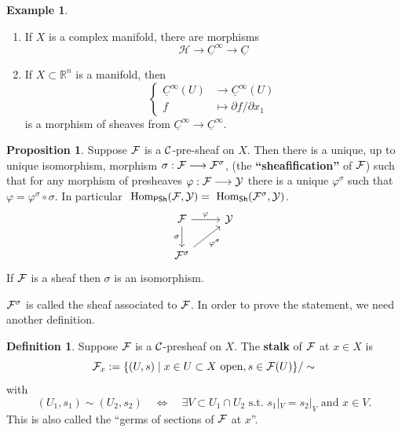 \documentclass[11pt]{article}
\theoremstyle{definition}
\newtheorem{prop}[thm]{Proposition}
\newtheorem{dfn}[thm]{Definition}
\newtheorem{ex}[thm]{Example}
\renewcommand{\hom}{\text{ Hom}}
\newcommand{\reals}{\mathbb R}
\newcommand{\calf}{{\cal F}}
\newcommand{\calc}{{\cal C}}
\begin{document}
\begin{ex}\ 
    \begin{enumerate}[label=(\arabic*)]
        \item 
        If $X$ is a complex manifold, there are morphisms
        $$
        \mathcal H \longrightarrow \underline C^\infty \longrightarrow \underline C
        $$
        \item
        If $X\subset \reals^n$ is a manifold, then
        $$
        \left\{
        \begin{aligned}
        \underline C^\infty (U) & \longrightarrow \underline C^\infty(U) \\
        f & \longmapsto \partial f / \partial x_1
        \end{aligned}
        \right.
        $$
        is a morphism of sheaves from $\underline C^\infty \longrightarrow \underline C^\infty$.
    \end{enumerate}
\end{ex}

\begin{prop}
    Suppose $\calf$ is a $\calc$-pre-sheaf on $X$. Then there is a unique, up to unique isomorphism, morphism $\sigma: \calf\longrightarrow \calf^\sigma$, (the \textbf{``sheafification''} of $\calf$) such that for any morphism of presheaves $\varphi: \calf \longrightarrow \mathcal Y$ there is a unique $\varphi^\sigma$ such that $\varphi = \varphi^\sigma \circ \sigma$. In particular $\hom_{\mathsf{PSh}} (\calf, \mathcal Y) = \hom_{\mathsf{Sh}} (\calf^\sigma, \mathcal Y)$.
    $$
    \begin{tikzcd}
    \calf \arrow[r, "\varphi"] \arrow[d, "\sigma"'] & \mathcal Y  \\
    \calf^\sigma \arrow{ru}[swap]{\varphi^\sigma}
    \end{tikzcd}
    $$
    If $\calf$ is a sheaf then $\sigma$ is an isomorphism.
\end{prop}

$\calf^\sigma$ is called the sheaf associated to $\calf$. In order to prove the statement, we need another definition.

\begin{dfn}
    Suppose $\calf$ is a $\calc$-presheaf on $X$. The \textbf{stalk} of $\calf$ at $x\in X$ is 
        $$
        \calf_x := \{ (U,s) \mid x \in U\subset X \text{ open}, s \in \calf(U)\} / \sim
        $$
        with 
        $$(U_1, s_1) \sim (U_2,s_2) \quad \Longleftrightarrow \quad \exists V\subset U_1 \cap U_2 \text{ s.t. } s_1|_V = s_2|_V \text{ and } x \in V.
        $$
        This is also called the ``germs of sections of $\calf$ at $x$''.
\end{dfn}
\end{document}
